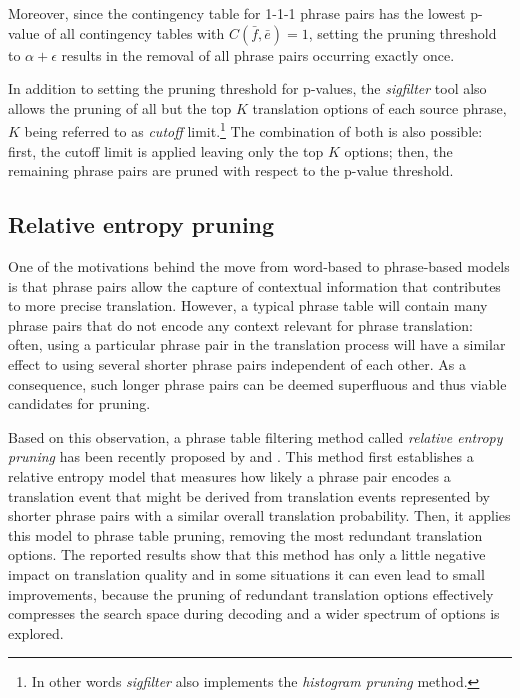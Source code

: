 Moreover, since the contingency table for 1-1-1 phrase pairs has the lowest p-value
of all contingency tables with $C(\bar{f},\bar{e}) = 1$, setting the pruning threshold
to $\alpha + \epsilon$ results in the removal of all phrase pairs occurring exactly once.

In addition to setting the pruning threshold for p-values, the \emph{sigfilter} tool
also allows the pruning of all but the top $K$ translation options of each source phrase,
$K$ being referred to as \emph{cutoff} limit.\footnote{In other words \emph{sigfilter}
also implements the \emph{histogram pruning} method.}
The combination of both is also possible: first, the cutoff limit is applied leaving
only the top $K$ options; then, the remaining phrase pairs are pruned with respect to the
p-value threshold.

\subsection{Relative entropy pruning}
\label{sec:relent-pruning}

One of the motivations behind the move from word-based to phrase-based models
is that phrase pairs allow the capture of contextual information that contributes
to more precise translation.
However, a typical phrase table will contain many phrase pairs that do not
encode any context relevant for phrase translation: often, using a particular
phrase pair in the translation process will have a similar effect to using
several shorter phrase pairs independent of each other.
As a consequence, such longer phrase pairs can be deemed superfluous and thus
viable candidates for pruning.

Based on this observation, a phrase table filtering method called \emph{relative
entropy pruning} has been recently proposed by \citet{ling:relentfilter} and
\citet{zens:systcomp}.
This method first establishes a relative entropy model that measures how likely
a phrase pair encodes a translation event that might be derived from translation
events represented by shorter phrase pairs with a similar overall translation
probability. Then, it applies this model to phrase table pruning, removing
the most redundant translation options.
The reported results show that this method has only a little negative impact on
translation quality and in some situations it can even lead to small improvements,
because the pruning of redundant translation options effectively compresses
the search space during decoding and a wider spectrum of options is explored.

